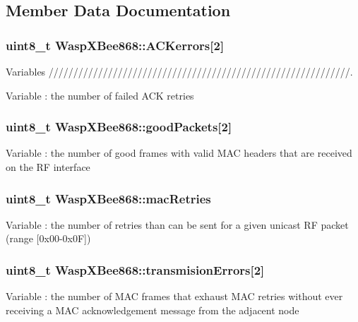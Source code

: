\subsection{Member Data Documentation}
\subsubsection[{\texorpdfstring{A\+C\+Kerrors}{ACKerrors}}]{\setlength{\rightskip}{0pt plus 5cm}uint8\+\_\+t Wasp\+X\+Bee868\+::\+A\+C\+Kerrors\mbox{[}2\mbox{]}}\hypertarget{class_wasp_x_bee868_aa053fc0674006ca7bc24933afcb5e437}{}\label{class_wasp_x_bee868_aa053fc0674006ca7bc24933afcb5e437}


Variables /////////////////////////////////////////////////////////////. 

Variable \+: the number of failed A\+CK retries 
\subsubsection[{\texorpdfstring{good\+Packets}{goodPackets}}]{\setlength{\rightskip}{0pt plus 5cm}uint8\+\_\+t Wasp\+X\+Bee868\+::good\+Packets\mbox{[}2\mbox{]}}\hypertarget{class_wasp_x_bee868_ab84ac057bd6a8698e3411523d71c6bfc}{}\label{class_wasp_x_bee868_ab84ac057bd6a8698e3411523d71c6bfc}
Variable \+: the number of good frames with valid M\+AC headers that are received on the RF interface 
\subsubsection[{\texorpdfstring{mac\+Retries}{macRetries}}]{\setlength{\rightskip}{0pt plus 5cm}uint8\+\_\+t Wasp\+X\+Bee868\+::mac\+Retries}\hypertarget{class_wasp_x_bee868_a90eb13a216470e49f72cc88c24186769}{}\label{class_wasp_x_bee868_a90eb13a216470e49f72cc88c24186769}
Variable \+: the number of retries than can be sent for a given unicast RF packet (range \mbox{[}0x00-\/0x0F\mbox{]}) 
\subsubsection[{\texorpdfstring{transmision\+Errors}{transmisionErrors}}]{\setlength{\rightskip}{0pt plus 5cm}uint8\+\_\+t Wasp\+X\+Bee868\+::transmision\+Errors\mbox{[}2\mbox{]}}\hypertarget{class_wasp_x_bee868_af213d73818fe69e28e1ee308c19adc75}{}\label{class_wasp_x_bee868_af213d73818fe69e28e1ee308c19adc75}
Variable \+: the number of M\+AC frames that exhaust M\+AC retries without ever receiving a M\+AC acknowledgement message from the adjacent node 

